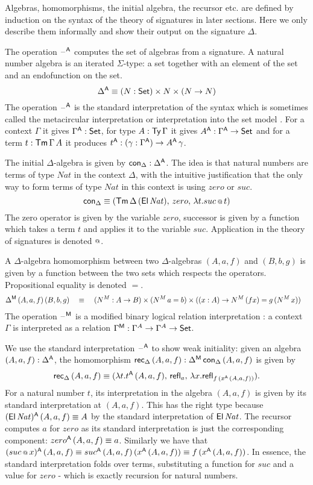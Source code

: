 \documentclass[acmsmall,review,anonymous]{acmart}\settopmatter{printfolios=true,printccs=false,printacmref=false}
\begin{document}
Algebras, homomorphisms, the initial algebra, the recursor etc. are
defined by induction on the syntax of the theory of signatures in
later sections. Here we only describe them informally and show their
output on the signature $\Delta$.

The operation $\mathord{\hspace{1pt}\text{--}\hspace{1pt}}^{\mathsf{A}}$ computes the set of algebras from a
signature. A natural number algebra is an iterated $\Sigma$-type: a
set together with an element of the set and an endofunction on the
set.
\[
\Delta^{\mathsf{A}} \equiv (N:\mathsf{Set})\times N \times (N \rightarrow N)
\]
The operation $\mathord{\hspace{1pt}\text{--}\hspace{1pt}}^{\mathsf{A}}$ is the standard interpretation of the syntax
which is sometimes called the metacircular interpretation or
interpretation into the set model \cite{ttintt}. For a context
$\Gamma$ it gives $\Gamma^{\mathsf{A}}:\mathsf{Set}$, for type $A : \mathsf{Ty}\,\Gamma$ it
gives $A^{\mathsf{A}}:\Gamma^{\mathsf{A}}\rightarrow\mathsf{Set}$ and for a term $t:\mathsf{Tm}\,\Gamma\,A$ it
produces $t^{\mathsf{A}}:(\gamma:\Gamma^{\mathsf{A}})\rightarrow A^{\mathsf{A}}\,\gamma$.

The initial $\Delta$-algebra is given by $\mathsf{con}_\Delta :
\Delta^{\mathsf{A}}$. The idea is that natural numbers are terms of type $Nat$
in the context $\Delta$, with the intuitive justification that the
only way to form terms of type $Nat$ in this context is using $zero$
or $suc$.
\[
\mathsf{con}_\Delta \equiv (\mathsf{Tm}\,\Delta\,(\mathsf{El}\,\mathit{Nat}),\, zero,\, \lambda t.suc \mathop{{\scriptstyle @}} t)
\]
The zero operator is given by the variable $zero$, successor is given
by a function which takes a term $t$ and applies it to the variable
$suc$. Application in the theory of signatures is denoted $\mathop{{\scriptstyle @}}$.

A $\Delta$-algebra homomorphism between two $\Delta$-algebras
$(A,a,f)$ and $(B,b,g)$ is given by a function between the two sets
which respects the operators. Propositional equality is denoted $=$.
\begin{alignat*}{5}
  & \Delta^{\mathsf{M}}\,(A,a,f)\,(B,b,g) && \equiv\,\, && (N^M:A\rightarrow B)\times (N^M\,a=b)\times ((x:A)\rightarrow N^M\,(f x)=g\,(N^M\,x))
\end{alignat*}
The operation $\mathord{\hspace{1pt}\text{--}\hspace{1pt}}^{\mathsf{M}}$ is a modified binary logical relation
interpretation \cite{bernardy12parametricity}: a context $\Gamma$
is interpreted as a relation $\Gamma^{\mathsf{M}}:\Gamma^A\rightarrow\Gamma^A\rightarrow\mathsf{Set}$.

We use the standard interpretation $\mathord{\hspace{1pt}\text{--}\hspace{1pt}}^{\mathsf{A}}$ to show weak
initiality: given an algebra $(A,a,f):\Delta^{\mathsf{A}}$, the homomorphism
$\mathsf{rec}_\Delta\,(A,a,f):\Delta^{\mathsf{M}}\,\mathsf{con}_\Delta\,(A,a,f)$ is given by
\[
\mathsf{rec}_\Delta\,(A,a,f) \equiv (\lambda t.t^{\mathsf{A}}\,(A,a,f),\, \mathsf{refl}_a,\, \lambda x.\mathsf{refl}_{f\,(x^{\mathsf{A}}\,(A,a,f))}).
\]
For a natural number $t$, its interpretation in the algebra
$(A,a,f)$ is given by its standard interpretation at $(A,a,f)$. This
has the right type because $(\mathsf{El}\,\mathit{Nat})^{\mathsf{A}}\,(A,a,f)\equiv A$
by the standard interpretation of $\mathsf{El}\,\mathit{Nat}$. The recursor
computes $a$ for $\mathit{zero}$ as its standard interpretation is
just the corresponding component: $zero^{\mathsf{A}}\,(A,a,f)\equiv
a$. Similarly we have that $(suc \mathop{{\scriptstyle @}} x)^{\mathsf{A}}\,(A,a,f) \equiv
suc^{\mathsf{A}}\,(A,a,f)\,(x^{\mathsf{A}}\,(A,a,f)) \equiv f\,(x^{\mathsf{A}}\,(A,a,f))$. In
essence, the standard interpretation folds over terms, substituting a
function for $suc$ and a value for $zero$ - which is exactly recursion
for natural numbers.
\end{document}
